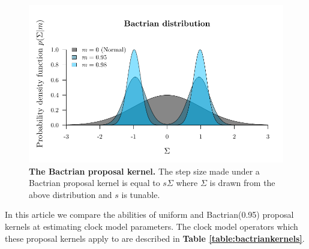 \documentclass[10pt,letterpaper]{article}
\begin{document}
\begin{figure}[!h]
\includegraphics[width=\textwidth]{Figures/bactrian.pdf}
\caption{\textbf{The Bactrian proposal kernel.} The step size made under a Bactrian proposal kernel is equal to $s \Sigma$ where $\Sigma$ is drawn from the above distribution and $s$ is tunable.   }
\label{fig:bactrian}
\end{figure}





In this article we compare the abilities of uniform and Bactrian(0.95) proposal kernels at estimating clock model parameters. 
The clock model operators which these proposal kernels apply to are described in \textbf{Table \ref{table:bactriankernels}}.
\end{document}
